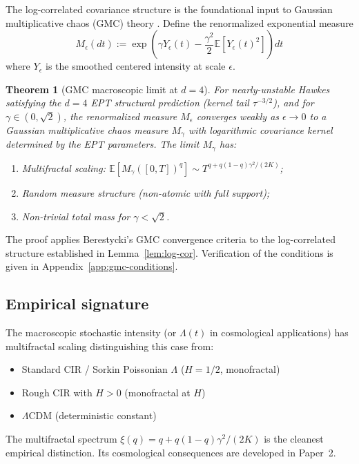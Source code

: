 \documentclass[11pt,a4paper]{article}
\newtheorem{theorem}{Theorem}
\begin{document}
The log-correlated covariance structure is the foundational input to Gaussian multiplicative chaos (GMC) theory \cite{RhodesVargas2014,Berestycki2017}. Define the renormalized exponential measure
\begin{equation}
M_\epsilon(dt) := \exp\left(\gamma Y_\epsilon(t) - \frac{\gamma^2}{2}\mathbb{E}[Y_\epsilon(t)^2]\right) dt
\end{equation}
where $Y_\epsilon$ is the smoothed centered intensity at scale $\epsilon$.

\begin{theorem}[GMC macroscopic limit at $d=4$]
\label{thm:gmc}
For nearly-unstable Hawkes satisfying the $d = 4$ EPT structural prediction (kernel tail $\tau^{-3/2}$), and for $\gamma \in (0, \sqrt{2})$, the renormalized measure $M_\epsilon$ converges weakly as $\epsilon \to 0$ to a Gaussian multiplicative chaos measure $M_\gamma$ with logarithmic covariance kernel determined by the EPT parameters. The limit $M_\gamma$ has:
\begin{enumerate}
\item[(i)] Multifractal scaling: $\mathbb{E}[M_\gamma([0,T])^q] \sim T^{q + q(1-q)\gamma^2/(2K)}$;
\item[(ii)] Random measure structure (non-atomic with full support);
\item[(iii)] Non-trivial total mass for $\gamma < \sqrt{2}$.
\end{enumerate}
\end{theorem}

The proof applies Berestycki's GMC convergence criteria \cite{Berestycki2017} to the log-correlated structure established in Lemma~\ref{lem:log-cor}. Verification of the conditions is given in Appendix~\ref{app:gmc-conditions}.

\subsection{Empirical signature}

The macroscopic stochastic intensity (or $\Lambda(t)$ in cosmological applications) has multifractal scaling distinguishing this case from:
\begin{itemize}
\item Standard CIR / Sorkin Poissonian $\Lambda$ ($H = 1/2$, monofractal)
\item Rough CIR with $H > 0$ (monofractal at $H$)
\item $\Lambda$CDM (deterministic constant)
\end{itemize}
The multifractal spectrum $\xi(q) = q + q(1-q)\gamma^2/(2K)$ is the cleanest empirical distinction. Its cosmological consequences are developed in Paper~2.
\end{document}
